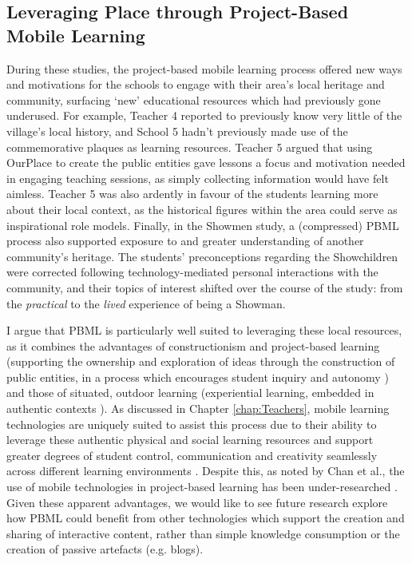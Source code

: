 \subsection{Leveraging Place through Project-Based Mobile Learning}
During these studies, the project-based mobile learning process offered new ways and motivations for the schools to engage with their area's local heritage and community, surfacing `new' educational resources which had previously gone underused. For example, Teacher 4 reported to previously know very little of the village's local history, and School 5 hadn't previously made use of the commemorative plaques as learning resources. Teacher 5 argued that using OurPlace to create the public entities gave lessons a focus and motivation needed in engaging teaching sessions, as simply collecting information would have felt aimless. Teacher 5 was also ardently in favour of the students learning more about their local context, as the historical figures within the area could serve as inspirational role models. Finally, in the Showmen study, a (compressed) PBML process also supported exposure to and greater understanding of another community's heritage. The students' preconceptions regarding the Showchildren were corrected following technology-mediated personal interactions with the community, and their topics of interest shifted over the course of the study: from the \textit{practical} to the \textit{lived} experience of being a Showman.

I argue that PBML is particularly well suited to leveraging these local resources, as it combines the advantages of constructionism and project-based learning (supporting the ownership and exploration of ideas through the construction of public entities, in a process which encourages student inquiry and autonomy \citep{Noss2017, Larmer2015}) and those of situated, outdoor learning (experiential learning, embedded in authentic contexts \citep{Lave1991}). As discussed in Chapter \ref{chap:Teachers}, mobile learning technologies are uniquely suited to assist this process due to their ability to leverage these authentic physical and social learning resources and support greater degrees of student control, communication and creativity seamlessly across different learning environments \citep{Sharples2007}. Despite this, as noted by Chan et al., the use of mobile technologies in project-based learning has been under-researched \citep{Chan2015}. Given these apparent advantages, we would like to see future research explore how PBML could benefit from other technologies which support the creation and sharing of interactive content, rather than simple knowledge consumption or the creation of passive artefacts (e.g. blogs).

